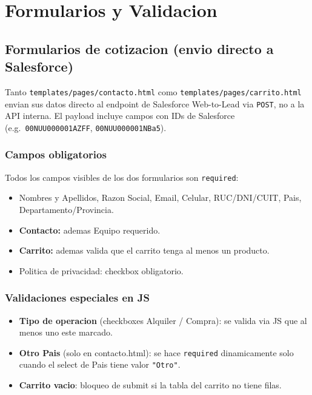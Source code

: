 \documentclass[11pt,a4paper]{article}
\begin{document}
\section{Formularios y Validacion}

\subsection{Formularios de cotizacion (envio directo a Salesforce)}

Tanto \texttt{templates/pages/contacto.html} como
\texttt{templates/pages/carrito.html} envian sus datos directo al endpoint
de Salesforce Web-to-Lead via \texttt{POST}, no a la API interna. El payload
incluye campos con IDs de Salesforce (e.g.\ \texttt{00NUU000001AZFF},
\texttt{00NUU000001NBa5}).

\subsubsection{Campos obligatorios}

Todos los campos visibles de los dos formularios son \texttt{required}:

\begin{itemize}[leftmargin=*]
    \item Nombres y Apellidos, Razon Social, Email, Celular,
        RUC/DNI/CUIT, Pais, Departamento/Provincia.
    \item \textbf{Contacto:} ademas Equipo requerido.
    \item \textbf{Carrito:} ademas valida que el carrito tenga al menos un
        producto.
    \item Politica de privacidad: checkbox obligatorio.
\end{itemize}

\subsubsection{Validaciones especiales en JS}

\begin{itemize}[leftmargin=*]
    \item \textbf{Tipo de operacion} (checkboxes Alquiler / Compra): se
        valida via JS que al menos uno este marcado.
    \item \textbf{Otro Pais} (solo en contacto.html): se hace
        \texttt{required} dinamicamente solo cuando el select de Pais tiene
        valor \texttt{"Otro"}.
    \item \textbf{Carrito vacio}: bloqueo de submit si la tabla del carrito
        no tiene filas.
\end{itemize}
\end{document}
